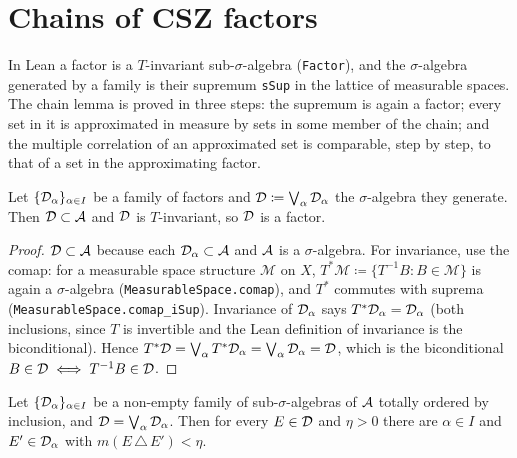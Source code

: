 \label{chap:structure}

\section{Chains of CSZ factors}

In Lean a factor is a $T$-invariant sub-$\sigma$-algebra (\texttt{Factor}), and the
$\sigma$-algebra generated by a family is their supremum \texttt{sSup} in the lattice of
measurable spaces.  The chain lemma is proved in three steps: the supremum is again a factor;
every set in it is approximated in measure by sets in some member of the chain; and the
multiple correlation of an approximated set is comparable, step by step, to that of a set in
the approximating factor.

\begin{lemma}
  \label{lem:sSup-factor}
  \leanok
  Let $\{\mathcal{D}_\alpha\}_{\alpha \in I}$ be a family of factors and $\mathcal{D} \coloneqq \bigvee_\alpha \mathcal{D}_\alpha$
  the $\sigma$-algebra they generate.  Then $\mathcal{D} \subset \mathcal{A}$ and $\mathcal{D}$ is $T$-invariant, so
  $\mathcal{D}$ is a factor.
\end{lemma}

\begin{proof}
  $\mathcal{D} \subset \mathcal{A}$ because each $\mathcal{D}_\alpha \subset \mathcal{A}$ and $\mathcal{A}$ is a $\sigma$-algebra.
  For invariance, use the comap: for a measurable space structure $\mathcal M$ on $X$,
  $T^{\ast}\mathcal M \coloneqq \{T^{-1}B : B \in \mathcal M\}$ is again a $\sigma$-algebra
  (\texttt{MeasurableSpace.comap}), and $T^{\ast}$ commutes with suprema
  (\texttt{MeasurableSpace.comap\_iSup}).  Invariance of $\mathcal{D}_\alpha$ says
  $T^{\ast}\mathcal{D}_\alpha = \mathcal{D}_\alpha$ (both inclusions, since $T$ is invertible and the Lean
  definition of invariance is the biconditional).  Hence
  $T^{\ast}\mathcal{D} = \bigvee_\alpha T^{\ast}\mathcal{D}_\alpha = \bigvee_\alpha \mathcal{D}_\alpha = \mathcal{D}$, which is the
  biconditional $B \in \mathcal{D} \iff T^{-1}B \in \mathcal{D}$.
\end{proof}

\begin{lemma}
  \label{lem:chain-approx}
  \leanok
  Let $\{\mathcal{D}_\alpha\}_{\alpha \in I}$ be a non-empty family of sub-$\sigma$-algebras of $\mathcal{A}$
  totally ordered by inclusion, and $\mathcal{D} = \bigvee_\alpha \mathcal{D}_\alpha$.  Then for every
  $E \in \mathcal{D}$ and $\eta > 0$ there are $\alpha \in I$ and $E' \in \mathcal{D}_\alpha$ with
  $m(E \,\triangle\, E') < \eta$.
\end{lemma}

